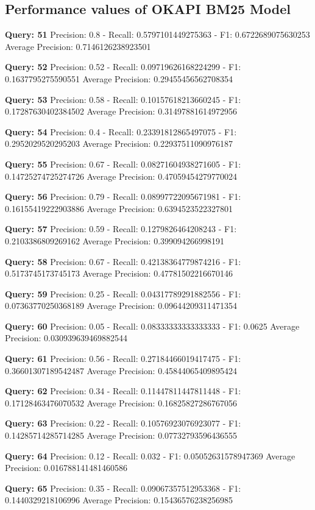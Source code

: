 \documentclass[a4paper, 11pt]{article}
\begin{document}
\subsection{Performance values of OKAPI BM25 Model}
\textbf{Query: 51}
Precision: 0.8 - Recall: 0.5797101449275363 - F1: 0.6722689075630253 Average Precision: 0.7146126238923501

\textbf{Query: 52}
Precision: 0.52 - Recall: 0.09719626168224299 - F1: 0.1637795275590551 Average Precision: 0.29455456562708354

\textbf{Query: 53}
Precision: 0.58 - Recall: 0.10157618213660245 - F1: 0.17287630402384502 Average Precision: 0.31497881614972956

\textbf{Query: 54}
Precision: 0.4 - Recall: 0.23391812865497075 - F1: 0.2952029520295203 Average Precision: 0.22937511090976187

\textbf{Query: 55}
Precision: 0.67 - Recall: 0.08271604938271605 - F1: 0.14725274725274726 Average Precision: 0.47059454279770024

\textbf{Query: 56}
Precision: 0.79 - Recall: 0.08997722095671981 - F1: 0.16155419222903886 Average Precision: 0.6394523522327801

\textbf{Query: 57}
Precision: 0.59 - Recall: 0.1279826464208243 - F1: 0.2103386809269162 Average Precision: 0.399094266998191

\textbf{Query: 58}
Precision: 0.67 - Recall: 0.42138364779874216 - F1: 0.5173745173745173 Average Precision: 0.47781502216670146

\textbf{Query: 59}
Precision: 0.25 - Recall: 0.04317789291882556 - F1: 0.07363770250368189 Average Precision: 0.09644209311471354

\textbf{Query: 60}
Precision: 0.05 - Recall: 0.08333333333333333 - F1: 0.0625 Average Precision: 0.030939639469882544

\textbf{Query: 61}
Precision: 0.56 - Recall: 0.27184466019417475 - F1: 0.36601307189542487 Average Precision: 0.45844065409895424

\textbf{Query: 62}
Precision: 0.34 - Recall: 0.11447811447811448 - F1: 0.17128463476070532 Average Precision: 0.16825827286767056

\textbf{Query: 63}
Precision: 0.22 - Recall: 0.10576923076923077 - F1: 0.14285714285714285 Average Precision: 0.07732793596436555

\textbf{Query: 64}
Precision: 0.12 - Recall: 0.032 - F1: 0.05052631578947369 Average Precision: 0.016788141481460586

\textbf{Query: 65}
Precision: 0.35 - Recall: 0.09067357512953368 - F1: 0.1440329218106996 Average Precision: 0.15436576238256985
\end{document}
